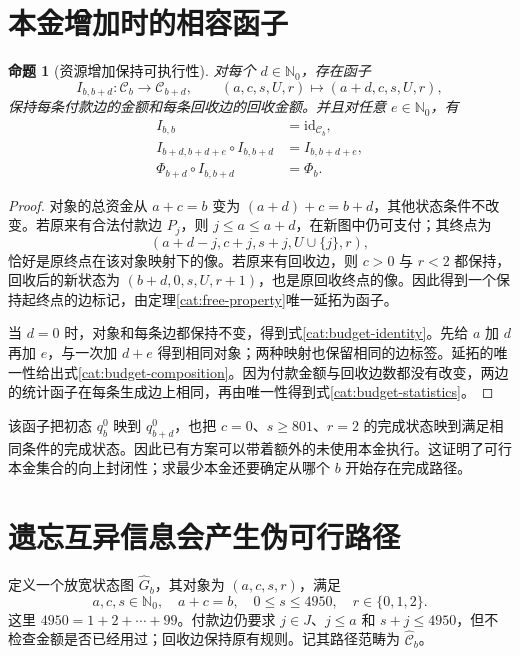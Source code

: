 \documentclass[UTF8,a4paper]{ctexbook}
\newtheorem{proposition}[theorem]{命题}
\theoremstyle{definition}
\numberwithin{equation}{chapter}
\newcommand{\1}{\mathbf{1}}
\begin{document}
\section{本金增加时的相容函子}

\begin{proposition}[资源增加保持可执行性]\label{cat:budget-functor}
对每个 $d\in\mathbb N_0$，存在函子
\[
I_{b,b+d}:\mathcal C_b\longrightarrow\mathcal C_{b+d},
\qquad
(a,c,s,U,r)\longmapsto(a+d,c,s,U,r),
\]
保持每条付款边的金额和每条回收边的回收金额。并且对任意 $e\in\mathbb N_0$，有
\begin{align}
I_{b,b}&=\mathrm{id}_{\mathcal C_b},\label{cat:budget-identity}\\
I_{b+d,b+d+e}\circ I_{b,b+d}&=I_{b,b+d+e},\label{cat:budget-composition}\\
\Phi_{b+d}\circ I_{b,b+d}&=\Phi_b.\label{cat:budget-statistics}
\end{align}
\end{proposition}
\begin{proof}
对象的总资金从 $a+c=b$ 变为 $(a+d)+c=b+d$，其他状态条件不改变。若原来有合法付款边 $P_j$，则 $j\le a\le a+d$，在新图中仍可支付；其终点为
\[
(a+d-j,c+j,s+j,U\cup\{j\},r),
\]
恰好是原终点在该对象映射下的像。若原来有回收边，则 $c>0$ 与 $r<2$ 都保持，回收后的新状态为 $(b+d,0,s,U,r+1)$，也是原回收终点的像。因此得到一个保持起终点的边标记，由定理\ref{cat:free-property}唯一延拓为函子。

当 $d=0$ 时，对象和每条边都保持不变，得到式\eqref{cat:budget-identity}。先给 $a$ 加 $d$ 再加 $e$，与一次加 $d+e$ 得到相同对象；两种映射也保留相同的边标签。延拓的唯一性给出式\eqref{cat:budget-composition}。因为付款金额与回收边数都没有改变，两边的统计函子在每条生成边上相同，再由唯一性得到式\eqref{cat:budget-statistics}。
\end{proof}

该函子把初态 $q_b^0$ 映到 $q_{b+d}^0$，也把 $c=0$、$s\ge801$、$r=2$ 的完成状态映到满足相同条件的完成状态。因此已有方案可以带着额外的未使用本金执行。这证明了可行本金集合的向上封闭性；求最少本金还要确定从哪个 $b$ 开始存在完成路径。

\section{遗忘互异信息会产生伪可行路径}

定义一个放宽状态图 $\widehat G_b$，其对象为 $(a,c,s,r)$，满足
\[
a,c,s\in\mathbb N_0,\quad a+c=b,\quad 0\le s\le4950,\quad r\in\{0,1,2\}.
\]
这里 $4950=1+2+\cdots+99$。付款边仍要求 $j\in J$、$j\le a$ 和 $s+j\le4950$，但不检查金额是否已经用过；回收边保持原有规则。记其路径范畴为 $\widehat{\mathcal C}_b$。
\end{document}
